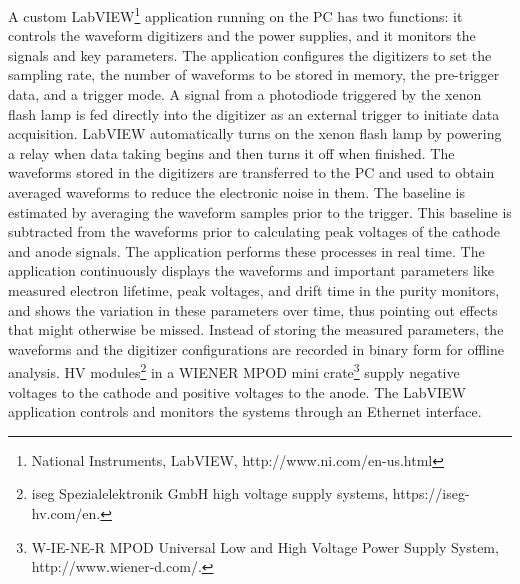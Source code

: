 A custom LabVIEW\footnote{National Instruments, LabVIEW\texttrademark{}, http://www.ni.com/en-us.html} application running on the  PC has two functions: it controls the waveform digitizers and the power supplies, and it monitors the signals and key parameters. The application configures the digitizers to set the sampling rate, the number of waveforms to be stored in memory, the pre-trigger data, and a trigger mode. A signal from a photodiode triggered by the xenon flash lamp is fed directly into the digitizer as an external trigger to initiate data acquisition.  LabVIEW automatically turns on the xenon flash lamp by powering a relay when data taking begins and then turns it off when finished.
The waveforms stored in the digitizers are transferred to the  PC and used to obtain averaged waveforms to reduce the electronic noise in them. %
The baseline  is estimated by averaging the waveform samples prior to the trigger. This baseline is subtracted from the waveforms prior to calculating peak voltages of the cathode and anode signals. %
The application performs these processes in real time. %
 The application continuously displays the waveforms and important parameters like measured electron lifetime, peak voltages, and drift time %
in the purity monitors, and shows the variation in these parameters over time, thus pointing out %
effects that might otherwise be missed. %
Instead of storing the measured parameters, the waveforms and the digitizer configurations are recorded in binary form for offline analysis.  HV modules\footnote{iseg Spezialelektronik GmbH\texttrademark{} high voltage supply systems, https://iseg-hv.com/en.} in a WIENER MPOD mini crate\footnote{W-IE-NE-R MPOD\texttrademark{} Universal Low and High Voltage Power Supply System, http://www.wiener-d.com/.} supply negative voltages to the cathode and positive voltages to the anode. The LabVIEW application controls and monitors the  systems through an Ethernet interface.

